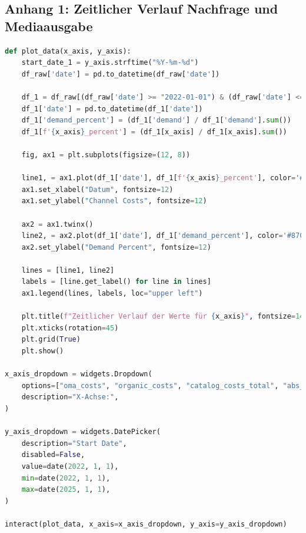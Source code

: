 \documentclass{common/nak}
\numberwithin{equation}{subsection}
\begin{document}
\subsection*{Anhang 1: Zeitlicher Verlauf Nachfrage und Mediaausgabe}
\label{Anhang1:ZeitlicherVerlaufMitPywidgets}
\UseRawInputEncoding
\begin{lstlisting}[language=Python, linewidth=\textwidth]
    def plot_data(x_axis, y_axis):
    start_date_1 = y_axis.strftime("%Y-%m-%d")
    df_raw['date'] = pd.to_datetime(df_raw['date'])
    
    df_1 = df_raw[(df_raw['date'] >= "2022-01-01") & (df_raw['date'] <= "2025-01-01")].copy() 
    df_1['date'] = pd.to_datetime(df_1['date'])
    df_1['demand_percent'] = (df_1['demand'] / df_1['demand'].sum())
    df_1[f'{x_axis}_percent'] = (df_1[x_axis] / df_1[x_axis].sum())
    
    fig, ax1 = plt.subplots(figsize=(12, 8))
    
    line1, = ax1.plot(df_1['date'], df_1[f'{x_axis}_percent'], color='#FF69B4', label=f"{x_axis}")
    ax1.set_xlabel("Datum", fontsize=12)
    ax1.set_ylabel("Channel Costs", fontsize=12)
    
    ax2 = ax1.twinx()
    line2, = ax2.plot(df_1['date'], df_1['demand_percent'], color='#87CEFA', label="Demand Percent")
    ax2.set_ylabel("Demand Percent", fontsize=12)
    
    lines = [line1, line2]
    labels = [line.get_label() for line in lines]
    ax1.legend(lines, labels, loc="upper left")
    
    plt.title(f"Zeitlicher Verlauf der Werte für {x_axis}", fontsize=14)
    plt.xticks(rotation=45)
    plt.grid(True)
    plt.show()

x_axis_dropdown = widgets.Dropdown(
    options=["oma_costs", "organic_costs", "catalog_costs_total", "abs_discount_value", "sum_vkb", "c_and_a_costs", "h_and_m_costs", "aboutyou_costs", "zalando_costs","mail_newsletter", "mail_trigger", "push_newsletter", "push_trigger""tv_costs", "podcast_costs", "addressable_tv_costs", "radio_costs", "dooh_ooh_costs", "youtube_costs", "olv_costs", "display_media_costs", "social_media_costs", "media_print_costs"],
    description="X-Achse:",
)

y_axis_dropdown = widgets.DatePicker(
    description="Start Date",
    disabled=False,
    value=date(2022, 1, 1),
    min=date(2022, 1, 1),  
    max=date(2025, 1, 1),
)

interact(plot_data, x_axis=x_axis_dropdown, y_axis=y_axis_dropdown)
\end{lstlisting}
\newpage
\end{document}
